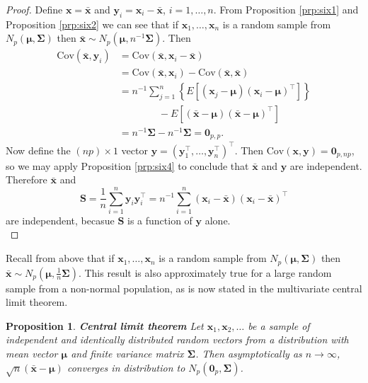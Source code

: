 \documentclass[]{book}
\newtheorem{proposition}{Proposition}[chapter]
\theoremstyle{definition}
\theoremstyle{definition}
\theoremstyle{definition}
\theoremstyle{remark}
\begin{document}
\begin{proof}
{}Define \(\boldsymbol x=\bar{\boldsymbol x}\) and \(\boldsymbol y_i=\boldsymbol x_i-\bar{\boldsymbol x}\), \(i=1, \ldots , n\). From Proposition \ref{prp:six1} and Proposition \ref{prp:six2} we can see that if \(\boldsymbol x_1, \ldots, \boldsymbol x_n\) is a random sample from \(N_p(\boldsymbol \mu, \boldsymbol \Sigma)\) then \(\bar{\boldsymbol x} \sim N_p (\boldsymbol \mu, n^{-1}\boldsymbol \Sigma)\). Then
\begin{align*}
\text{Cov}(\bar{\boldsymbol x},\boldsymbol y_i)&=\text{Cov}(\bar{\boldsymbol x}, \boldsymbol x_i -\bar{\boldsymbol x})\\
&=\text{Cov}(\bar{\boldsymbol x}, \boldsymbol x_i) - \text{Cov}(\bar{\boldsymbol x}, \bar{\boldsymbol x})\\
&=n^{-1}\sum_{j=1}^n \left \{E[(\boldsymbol x_j -\boldsymbol \mu)(\boldsymbol x_i-\boldsymbol \mu)^\top]\right \}\\
& \qquad \qquad -E[(\bar{\boldsymbol x}-\boldsymbol \mu)(\bar{\boldsymbol x}-\boldsymbol \mu)^\top]\\
&=n^{-1}\boldsymbol \Sigma- n^{-1}\boldsymbol \Sigma= {\mathbf 0}_{p,p}.
\end{align*}
Now define the \((np) \times 1\) vector \(\boldsymbol y=(\boldsymbol y_1^\top, \ldots , \boldsymbol y_n^\top)^\top\). Then \(\text{Cov}(\boldsymbol x,\boldsymbol y)={\mathbf 0}_{p, np}\),
so we may apply Proposition \ref{prp:six4} to conclude that \(\bar{\boldsymbol x}\) and \(\boldsymbol y\) are independent. Therefore \(\bar{\boldsymbol x}\) and
\[
\boldsymbol S=\frac{1}{n}\sum_{i=1}^n \boldsymbol y_i \boldsymbol y_i^\top =n^{-1}\sum_{i=1}^n (\boldsymbol x_i -\bar{\boldsymbol x})(\boldsymbol x_i -\bar{\boldsymbol x})^\top
\]
are independent, becasue \(\boldsymbol S\) is a function of \(\boldsymbol y\) alone.\\
\end{proof}

Recall from above that if \(\boldsymbol x_1, \ldots, \boldsymbol x_n\) is a random sample from \(N_p(\boldsymbol \mu, \boldsymbol \Sigma)\) then \(\bar{\boldsymbol x} \sim N_p (\boldsymbol \mu, \frac{1}{n}\boldsymbol \Sigma)\). This result is also approximately true for a large random sample from a non-normal population, as is now stated in the multivariate central limit theorem.

\begin{proposition}
\protect\hypertarget{prp:clt}{}{\label{prp:clt} }\textbf{Central limit theorem} Let \(\boldsymbol x_1, \boldsymbol x_2, \ldots\) be a sample of independent and identically distributed random vectors from a distribution with mean vector \(\boldsymbol \mu\) and finite variance matrix \(\boldsymbol \Sigma\). Then asymptotically as \(n \rightarrow \infty\), \(\sqrt{n}(\bar{\boldsymbol x}-\boldsymbol \mu)\) converges in distribution to \(N_p ({\mathbf 0}_p, \boldsymbol \Sigma)\).
\end{proposition}
\end{document}
